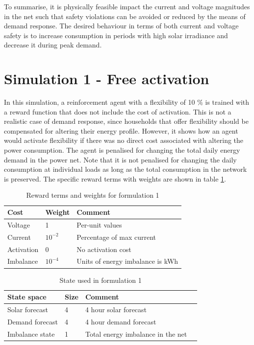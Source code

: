 \documentclass[class=book, crop=false, 11pt]{standalone}
\begin{document}
To summarise, it is physically feasible impact the current and voltage magnitudes in the net such that safety violations can be avoided or reduced by the means of demand response. The desired behaviour in terms of both current and voltage safety is to increase consumption in periods with high solar irradiance and decrease it during peak demand.


\section{Simulation 1 - Free activation} \label{section:result:config1}
In this simulation, a reinforcement agent with a flexibility of 10 \% is trained with a reward function that does not include the cost of activation. This is not a realistic case of demand response, since households that offer flexibility should be compensated for altering their energy profile. However, it shows how an agent would activate flexibility if there was no direct cost associated with altering the power consumption. The agent is penalised for changing the total daily energy demand in the power net. Note that it is not penalised for changing the daily consumption at individual loads as long as the total consumption in the network is preserved. The specific reward terms with weights are shown in table \ref{table:results:reward_formulation1}.

\begin{table}[h]
\centering
\caption{Reward terms and weights for formulation 1}
\begin{tabular}{l|ll}

Cost  & Weight & Comment
\\ 
\hline
Voltage &
1 &
Per-unit values
\\
Current &
$10^{-2}$ &
Percentage of max current 
\\
Activation &
0&
No activation cost
\\
Imbalance &
$10^{-4}$&
Units of energy imbalance is kWh
\\
\hline
\end{tabular}
\label{table:results:reward_formulation1}
\end{table}


\begin{table}[h]
\centering
\caption{State used in formulation 1}
\begin{tabular}{l|lll}

State space  & Size & Comment
\\ 
\hline
Solar forecast      &  4  &  4 hour solar forecast
\\ 

Demand forecast    &4 & 4 hour demand forecast 
\\ 
Imbalance state & 1  & Total energy imbalance in the net
\\
\hline
\end{tabular}
\label{table:results:state_formulation1}
\end{table}
\end{document}
